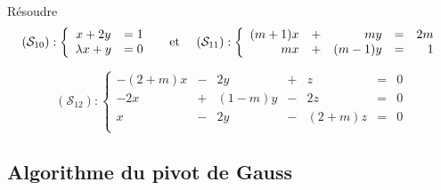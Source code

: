 \documentclass[a4paper, 11pt]{article}
\begin{document}
\begin{exercice}
Résoudre 
 $$(\mathcal{S}_{10}):\left\{ 
\begin{array}{cc}
x+2y&=1\\
\lambda x+y&=0
\end{array}
\right.\quad \text{ et } \quad 
(\mathcal{S}_{11}):\left\lbrace\begin{array}{rcrcr}
(m+1)x & + & my & = & 2m\\
mx & + & (m-1)y & = & 1\\
\end{array}\right.
$$

$$(\mathcal{S}_{12}):
\left\lbrace\begin{array}{rcrcrcr}
-(2+m)x & - & 2y & + & z & = & 0\\
-2x & + & (1-m)y & - & 2z & = & 0\\
  x & - & 2y & -     & (2+m)z & = & 0\\
\end{array}\right.$$
\end{exercice}



\subsection{Algorithme du pivot de Gauss}




%

\end{document}
